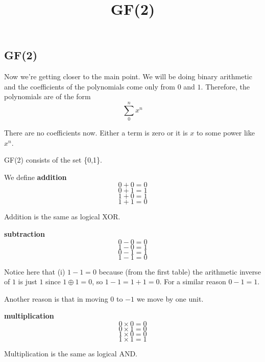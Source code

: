 \documentclass[11pt, oneside]{article}
\title{GF(2)}
\date{}
\begin{document}
\maketitle
\Large

\subsection*{GF(2)}

Now we're getting closer to the main point.  We will be doing binary arithmetic and the coefficients of the polynomials come only from $0$ and $1$.  Therefore, the polynomials are of the form
\[ \sum_0^n x^n \] 

There are no coefficients now.  Either a term is zero or it is $x$ to some power like $x^n$.

GF(2) consists of the set \{0,1\}.

We define \textbf{addition}
\[ 0 + 0 = 0 \]
\[ 0 + 1 = 1 \]
\[ 1 + 0 = 1 \]
\[ 1 + 1 = 0 \]

Addition is the same as logical XOR.

\textbf{subtraction}
\[ 0 - 0 = 0 \]
\[ 1 - 0 = 1 \] 
\[ 0 - 1 = 1 \]
\[ 1 - 1 = 0 \]

Notice here that (i) $1 - 1 = 0$ because (from the first table) the arithmetic inverse of $1$ is just $1$ since $1 \oplus 1 = 0$, so $1 - 1 = 1 + 1 = 0$.  For a similar reason $0 - 1 = 1$.

Another reason is that in moving  $0$ to $-1$ we move by one unit.

\textbf{multiplication}
\[ 0 \times 0 = 0 \]
\[ 0 \times 1 = 0 \]
\[ 1 \times 0 = 0 \]
\[ 1 \times 1 = 1 \]

Multiplication is the same as logical AND.
\end{document}
